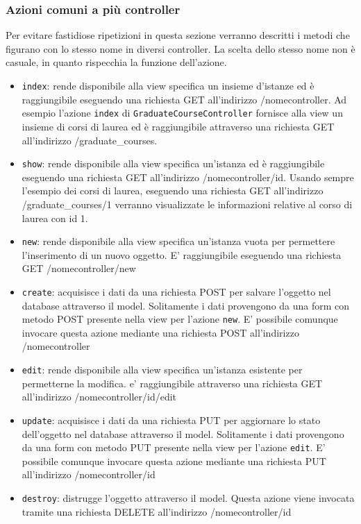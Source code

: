 \documentclass[11pt,a4paper]{article}
\begin{document}
\subsubsection{Azioni comuni a più controller}
Per evitare fastidiose ripetizioni in questa sezione verranno descritti i metodi che figurano con lo stesso nome in diversi controller. La scelta dello stesso nome non è casuale, in quanto rispecchia la funzione dell'azione.
\begin{itemize}
 \item \verb|index|: rende disponibile alla view specifica un insieme d'istanze ed è raggiungibile eseguendo una richiesta GET all'indirizzo /nomecontroller. Ad esempio l'azione \verb|index| di \verb|GraduateCourseController| fornisce alla view un insieme di corsi di laurea ed è raggiungibile attraverso una richiesta GET all'indirizzo /graduate\_courses.
 \item \verb|show|: rende disponibile alla view specifica un'istanza ed è raggiungibile eseguendo una richiesta GET all'indirizzo /nomecontroller/id. Usando sempre l'esempio dei corsi di laurea, eseguendo una richiesta GET all'indirizzo /graduate\_courses/1 verranno visualizzate le informazioni relative al corso di laurea con id 1.
 \item \verb|new|: rende disponibile alla view specifica un'istanza vuota per permettere l'inserimento di un nuovo oggetto. E' raggiungibile eseguendo una richiesta GET /nomecontroller/new
 \item \verb|create|: acquisisce i dati da una richiesta POST per salvare l'oggetto nel database attraverso il model. Solitamente i dati provengono da una form con metodo POST presente nella view per l'azione \verb|new|. E' possibile comunque invocare questa azione mediante una richiesta POST all'indirizzo /nomecontroller
 \item \verb|edit|: rende disponibile alla view specifica un'istanza esistente per permetterne la modifica. e' raggiungibile attraverso una richiesta GET all'indirizzo /nomecontroller/id/edit
 \item \verb|update|: acquisisce i dati da una richiesta PUT per aggiornare lo stato dell'oggetto nel database attraverso il model. Solitamente i dati provengono da una form con metodo PUT presente nella view per l'azione \verb|edit|. E' possibile comunque invocare questa azione mediante una richiesta PUT all'indirizzo /nomecontroller/id
 \item \verb|destroy|: distrugge l'oggetto attraverso il model. Questa azione viene invocata tramite una richiesta DELETE all'indirizzo /nomecontroller/id

\end{itemize}
\end{document}
